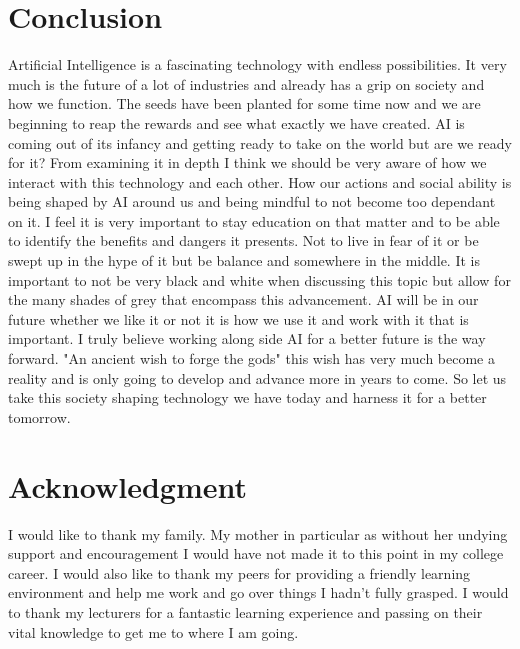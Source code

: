 \documentclass[conference]{IEEEtran}
\begin{document}
\section{Conclusion}
Artificial Intelligence is a fascinating technology with endless possibilities. It very much is the future of a lot of industries and already has a grip on society and how we function. The seeds have been planted for some time now and we are beginning to reap the rewards and see what exactly we have created. AI is coming out of its infancy and getting ready to take on the world but are we ready for it? From examining it in depth I think we should be very aware of how we interact with this technology and each other. How our actions and social ability is being shaped by AI around us and being mindful to not become too dependant on it. I feel it is very important to stay education on that matter and to be able to identify the benefits and dangers it presents. Not to live in fear of it or be swept up in the hype of it but be balance and somewhere in the middle. It is important to not be very black and white when discussing this topic but allow for the many shades of grey that encompass this advancement. AI will be in our future whether we like it or not it is how we use it and work with it that is important. I truly believe working along side AI for a better future is the way forward. "An ancient wish to forge the gods"\cite{McCorduck} this wish has very much become a reality and is only going to develop and advance more in years to come. So let us take this society shaping technology we have today and harness it for a better tomorrow.

\section*{Acknowledgment}

I would like to thank my family. My mother in particular as without her undying support and encouragement I would have not made it to this point in my college career. I would also like to thank my peers for providing a friendly learning environment and help me work and go over things I hadn't fully grasped. I would to thank my lecturers for a fantastic learning experience and passing on their vital knowledge to get me to where I am going.
\ifCLASSOPTIONcaptionsoff
  \newpage
\fi
\end{document}
